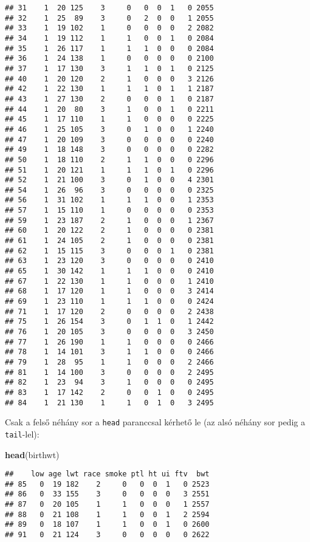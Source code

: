 \documentclass[
]{book}
\newenvironment{Shaded}{\begin{snugshade}}{\end{snugshade}}
\newcommand{\KeywordTok}[1]{\textcolor[rgb]{0.13,0.29,0.53}{\textbf{#1}}}
\newcommand{\NormalTok}[1]{#1}
\begin{document}
\begin{verbatim}
## 31    1  20 125    3     0   0  0  1   0 2055
## 32    1  25  89    3     0   2  0  0   1 2055
## 33    1  19 102    1     0   0  0  0   2 2082
## 34    1  19 112    1     1   0  0  1   0 2084
## 35    1  26 117    1     1   1  0  0   0 2084
## 36    1  24 138    1     0   0  0  0   0 2100
## 37    1  17 130    3     1   1  0  1   0 2125
## 40    1  20 120    2     1   0  0  0   3 2126
## 42    1  22 130    1     1   1  0  1   1 2187
## 43    1  27 130    2     0   0  0  1   0 2187
## 44    1  20  80    3     1   0  0  1   0 2211
## 45    1  17 110    1     1   0  0  0   0 2225
## 46    1  25 105    3     0   1  0  0   1 2240
## 47    1  20 109    3     0   0  0  0   0 2240
## 49    1  18 148    3     0   0  0  0   0 2282
## 50    1  18 110    2     1   1  0  0   0 2296
## 51    1  20 121    1     1   1  0  1   0 2296
## 52    1  21 100    3     0   1  0  0   4 2301
## 54    1  26  96    3     0   0  0  0   0 2325
## 56    1  31 102    1     1   1  0  0   1 2353
## 57    1  15 110    1     0   0  0  0   0 2353
## 59    1  23 187    2     1   0  0  0   1 2367
## 60    1  20 122    2     1   0  0  0   0 2381
## 61    1  24 105    2     1   0  0  0   0 2381
## 62    1  15 115    3     0   0  0  1   0 2381
## 63    1  23 120    3     0   0  0  0   0 2410
## 65    1  30 142    1     1   1  0  0   0 2410
## 67    1  22 130    1     1   0  0  0   1 2410
## 68    1  17 120    1     1   0  0  0   3 2414
## 69    1  23 110    1     1   1  0  0   0 2424
## 71    1  17 120    2     0   0  0  0   2 2438
## 75    1  26 154    3     0   1  1  0   1 2442
## 76    1  20 105    3     0   0  0  0   3 2450
## 77    1  26 190    1     1   0  0  0   0 2466
## 78    1  14 101    3     1   1  0  0   0 2466
## 79    1  28  95    1     1   0  0  0   2 2466
## 81    1  14 100    3     0   0  0  0   2 2495
## 82    1  23  94    3     1   0  0  0   0 2495
## 83    1  17 142    2     0   0  1  0   0 2495
## 84    1  21 130    1     1   0  1  0   3 2495
\end{verbatim}

Csak a felső néhány sor a \texttt{head} paranccsal kérhető le (az alsó néhány sor pedig a \texttt{tail}-lel):

\begin{Shaded}
\begin{Highlighting}[]
\KeywordTok{head}\NormalTok{(birthwt)}
\end{Highlighting}
\end{Shaded}

\begin{verbatim}
##    low age lwt race smoke ptl ht ui ftv  bwt
## 85   0  19 182    2     0   0  0  1   0 2523
## 86   0  33 155    3     0   0  0  0   3 2551
## 87   0  20 105    1     1   0  0  0   1 2557
## 88   0  21 108    1     1   0  0  1   2 2594
## 89   0  18 107    1     1   0  0  1   0 2600
## 91   0  21 124    3     0   0  0  0   0 2622
\end{verbatim}
\end{document}
